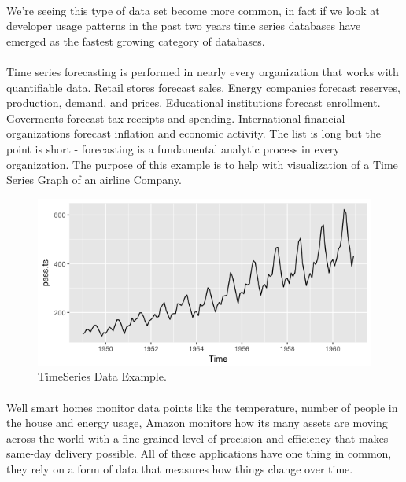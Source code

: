 \documentclass{article}
\begin{document}
    \paragraph{} 
    We're seeing this type of data set become more common, in fact if we look at developer usage patterns in the past two years time series databases have emerged as the fastest growing category of databases.
    
    
    
    \paragraph{}
    Time series forecasting is performed in nearly every organization that works with quantifiable data. Retail stores forecast sales. Energy companies forecast reserves, production, demand, and prices. Educational institutions forecast enrollment. Goverments forecast tax receipts and spending. International financial organizations forecast inflation and economic activity. The list is long but the point is short - forecasting is a fundamental analytic process in every organization. The purpose of this example is to help with visualization of a Time Series Graph of an airline Company.
    \begin{figure}[h!]
      \begin{center}
        \includegraphics[width=0.8\linewidth]{img/unnamed-chunk-6-1.png}
        \caption{TimeSeries Data Example.}
        \label{fig:snn}
      \end{center}
    \end{figure}



    \paragraph{} 
    Well smart homes monitor data points like the temperature, number of people in the house and energy usage,  Amazon monitors how its many assets are moving across the world with a fine-grained level of precision and efficiency that makes same-day delivery possible. All of these applications have one thing in common, they rely on a form of data that measures how things change over time. 
\end{document}
